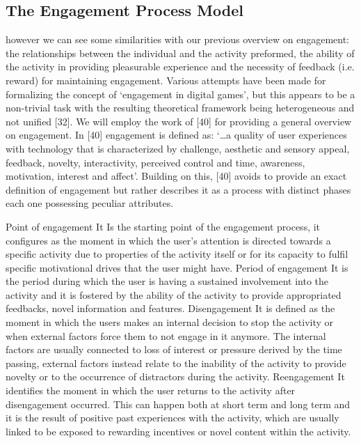 \subsection{The Engagement Process Model}
\label{eng_proc_model}
however we can see some similarities with our previous overview on engagement: the relationships between the individual and the activity preformed, the ability of the activity in providing pleasurable experience and the necessity of feedback (i.e. reward) for maintaining engagement.
Various attempts have been made for formalizing the concept of ‘engagement in digital games’, but this appears to be a non-trivial task with the resulting theoretical framework being heterogeneous and not unified [32]. We will employ the work of [40] for providing a general overview on engagement. In [40] engagement is defined as:
‘…a quality of user experiences with technology that is characterized by challenge, aesthetic and sensory appeal, feedback, novelty, interactivity, perceived control and time, awareness, motivation, interest and affect’.
Building on this, [40] avoids to provide an exact definition of engagement but rather describes it as a process with distinct phases each one possessing peculiar attributes.

Point of engagement
It Is the starting point of the engagement process, it configures as the moment in which the user’s attention is directed towards a specific activity due to properties of the activity itself or for its capacity to fulfil specific motivational drives that the user might have.
Period of engagement
It is the period during which the user is having a sustained involvement into the activity and it is fostered by the ability of the activity to provide appropriated feedbacks, novel information and features.
Disengagement
It is defined as the moment in which the users makes an internal decision to stop the activity or when external factors force them to not engage in it anymore. The internal factors are usually connected to loss of interest or pressure derived by the time passing, external factors instead relate to the inability of the activity to provide novelty or to the occurrence of distractors during the activity.
Reengagement
It identifies the moment in which the user returns to the activity after disengagement occurred. This can happen both at short term and long term and it is the result of positive past experiences with the activity, which are usually linked to be exposed to rewarding incentives or novel content within the activity.
